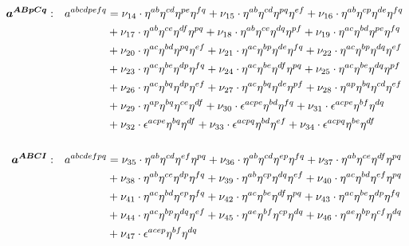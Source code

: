 \documentclass[a4paper,12pt, DIV=14, BCOR=5mm, twoside, headsepline]{scrbook}
\begin{document}
\begin{align}\label{LorentzGR2}
\begin{alignedat}{2}
\boldsymbol{a^{ABpCq}}&: \ \ \ & a^{abcdpefq}  &= \nu_{14}\cdot\eta^{ab}\eta^{cd}\eta^{pe}\eta^{fq}+\nu_{15}\cdot\eta^{ab}\eta^{cd}\eta^{pq}\eta^{ef}
+\nu_{16}\cdot\eta^{ab}\eta^{cp}\eta^{de}\eta^{fq}\\ &  &\hphantom{=} &
+\nu_{17}\cdot\eta^{ab}\eta^{ce}\eta^{df}\eta^{pq}+ 
\nu_{18}\cdot\eta^{ab}\eta^{ce}\eta^{dq}\eta^{pf}+\nu_{19}\cdot\eta^{ac}\eta^{bd}\eta^{pe}\eta^{fq} \\ &  &\hphantom{=} &
+\nu_{20}\cdot\eta^{ac}\eta^{bd}\eta^{pq}\eta^{ef}+\nu_{21}\cdot\eta^{ac}\eta^{bp}\eta^{de}\eta^{fq}+ 
\nu_{22}\cdot\eta^{ac}\eta^{bp}\eta^{dq}\eta^{ef} \\ &  &\hphantom{=} &
+\nu_{23}\cdot\eta^{ac}\eta^{be}\eta^{dp}\eta^{fq}+
\nu_{24}\cdot\eta^{ac}\eta^{be}\eta^{df}\eta^{pq}+\nu_{25}\cdot\eta^{ac}\eta^{be}\eta^{dq}\eta^{pf} \\ &  &\hphantom{=} &
+\nu_{26}\cdot\eta^{ac}\eta^{bq}\eta^{dp}\eta^{ef}+\nu_{27}\cdot\eta^{ac}\eta^{bq}\eta^{de}\eta^{pf}+ 
\nu_{28}\cdot\eta^{ap}\eta^{bq}\eta^{cd}\eta^{ef} \\ &  &\hphantom{=} &
+\nu_{29}\cdot\eta^{ap}\eta^{bq}\eta^{ce}\eta^{df} + \nu_{30}\cdot\epsilon^{acpe}\eta^{bd}\eta^{fq}+\nu_{31}\cdot\epsilon^{acpe}\eta^{bf}\eta^{dq} \\ &  &\hphantom{=} &
+\nu_{32}\cdot\epsilon^{acpe}\eta^{bq}\eta^{df}+\nu_{33}\cdot\epsilon^{acpq}\eta^{bd}\eta^{ef} 
+\nu_{34}\cdot\epsilon^{acpq}\eta^{be}\eta^{df} \\
\\
\boldsymbol{a^{ABCI}}&: \ \ \ & a^{abcdefpq}  &= \nu_{35}\cdot\eta^{ab}\eta^{cd}\eta^{ef}\eta^{pq}+\nu_{36}\cdot\eta^{ab}\eta^{cd}\eta^{ep}\eta^{fq}+\nu_{37}\cdot\eta^{ab}\eta^{ce}\eta^{df}\eta^{pq} \\ &  &\hphantom{=} &
+\nu_{38}\cdot\eta^{ab}\eta^{ce}\eta^{dp}\eta^{fq}+\nu_{39}\cdot\eta^{ab}\eta^{cp}\eta^{dq}\eta^{ef}+\nu_{40}\cdot\eta^{ac}\eta^{bd}\eta^{ef}\eta^{pq}
\\ &  &\hphantom{=} &
+\nu_{41}\cdot\eta^{ac}\eta^{bd}\eta^{ep}\eta^{fq}+\nu_{42}\cdot\eta^{ac}\eta^{be}\eta^{df}\eta^{pq}+\nu_{43}\cdot\eta^{ac}\eta^{be}\eta^{dp}\eta^{fq}
\\ &  &\hphantom{=} &
+\nu_{44}\cdot\eta^{ac}\eta^{bp}\eta^{dq}\eta^{ef}+\nu_{45}\cdot\eta^{ae}\eta^{bf}\eta^{cp}\eta^{dq}+\nu_{46}\cdot\eta^{ae}\eta^{bp}\eta^{cf}\eta^{dq} \\ &  &\hphantom{=} & 
+\nu_{47}\cdot\epsilon^{acep}\eta^{bf}\eta^{dq}
\end{alignedat}
\end{align}
\end{document}
